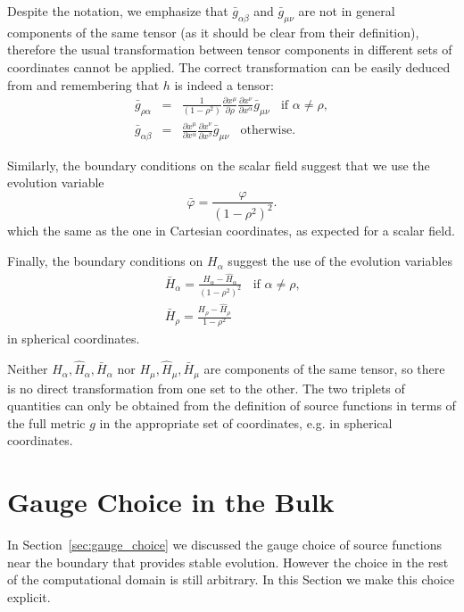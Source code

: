 \documentclass[12pt]{iopart} %
\begin{document}
Despite the notation, we emphasize that $\bar{g}_{\alpha\beta}$ and $\bar{g}_{\mu\nu}$ are not in general components of the same tensor (as it should be clear from their definition), therefore the usual transformation between tensor components in different sets of coordinates cannot be applied. The correct transformation can be easily deduced from  and  remembering that $h$ is indeed a tensor: 
\begin{eqnarray}\label{eq:cartosph}
\bar{g}_{\rho\alpha}&=&\frac{1}{(1-\rho^2)}\frac{\partial x^\mu}{\partial \rho}\frac{\partial x^\nu}{\partial x^\alpha}\bar{g}_{\mu\nu}\;\; \textrm{ if $\alpha\neq\rho$}, \\ \nonumber
\bar{g}_{\alpha\beta}&=&\frac{\partial x^\mu}{\partial x^\alpha}\frac{\partial x^\nu}{\partial x^\beta}\bar{g}_{\mu\nu}\;\; \textrm{ otherwise}.
\end{eqnarray}

Similarly, the boundary conditions on the scalar field  suggest that we use the evolution variable
\begin{equation}
\bar{\varphi}=\frac{\varphi }{(1-\rho^2)^2}.
\end{equation}
which the same as the one in Cartesian coordinates, as expected for a scalar field.

Finally, the boundary conditions  on $H_\alpha$ suggest the use of the evolution variables
\begin{eqnarray}
 \bar{H}_\alpha=\frac{H_\alpha-\hat{H}_\alpha}{(1-\rho^2)^2 } \;\; \textrm{ if $\alpha\neq\rho$,} \\ \nonumber
 \bar{H}_\rho=\frac{H_\rho-\hat{H}_\rho}{1-\rho^2 }
 \end{eqnarray}
in spherical coordinates.

Neither $H_\alpha,\hat{H}_\alpha,\bar{H}_\alpha$ nor $H_\mu,\hat{H}_\mu,\bar{H}_\mu$ are components of the same tensor, so there is no direct transformation from one set to the other. The two triplets of quantities can only be obtained from the definition of source functions in terms of the full metric $g$ in the appropriate set of coordinates, e.g.  in spherical coordinates.

\section{Gauge Choice in the Bulk}
\label{sec:GCbulk}

In Section~\ref{sec:gauge_choice} we discussed the gauge choice of source functions near the boundary that provides stable evolution. However the choice in the rest of the computational domain is still arbitrary. In this Section we make this choice explicit.
\end{document}
